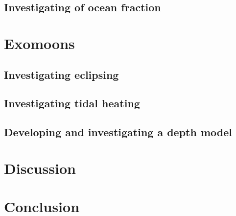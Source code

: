 \documentclass[12pt, onecolumn]{revtex4-2}    %
\begin{document}
\subsection{Investigating of ocean fraction} \label{ssec:InvOceanFraction}%

\section{Exomoons} \label{sec:Exomoons}
\subsection{Investigating eclipsing} \label{ssec:InvEclipsing}
\subsection{Investigating tidal heating} \label{ssec:InvTidalHeating}
\subsection{Developing and investigating a depth model} \label{ssec:DevInvDepthModel} %

\section{Discussion} \label{sec:Discussion}

\section{Conclusion} \label{sec:Conclusion}
\end{document}
